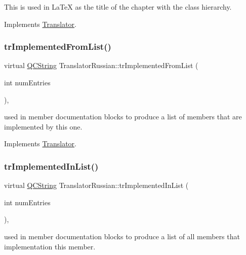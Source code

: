 This is used in La\+TeX as the title of the chapter with the class hierarchy. 

Implements \mbox{\hyperlink{class_translator}{Translator}}.

\mbox{\label{class_translator_russian_a276cc3c3a2adbb7eb183ef4e13d809b5}} 
\subsubsection{\texorpdfstring{trImplementedFromList()}{trImplementedFromList()}}
{\footnotesize\ttfamily virtual \mbox{\hyperlink{class_q_c_string}{Q\+C\+String}} Translator\+Russian\+::tr\+Implemented\+From\+List (\begin{DoxyParamCaption}\item[{int}]{num\+Entries }\end{DoxyParamCaption})\hspace{0.3cm}{\ttfamily [inline]}, {\ttfamily [virtual]}}

used in member documentation blocks to produce a list of members that are implemented by this one. 

Implements \mbox{\hyperlink{class_translator}{Translator}}.

\mbox{\label{class_translator_russian_a7cbd985398588a145bdd317f67e816ff}} 
\subsubsection{\texorpdfstring{trImplementedInList()}{trImplementedInList()}}
{\footnotesize\ttfamily virtual \mbox{\hyperlink{class_q_c_string}{Q\+C\+String}} Translator\+Russian\+::tr\+Implemented\+In\+List (\begin{DoxyParamCaption}\item[{int}]{num\+Entries }\end{DoxyParamCaption})\hspace{0.3cm}{\ttfamily [inline]}, {\ttfamily [virtual]}}

used in member documentation blocks to produce a list of all members that implementation this member. 

